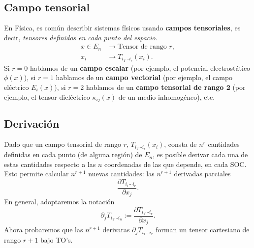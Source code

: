 \subsection{Campo tensorial}
En Física, es común describir sistemas físicos usando \textbf{campos tensoriales}, es decir, \textit{tensores definidos en cada punto del espacio}.
\begin{align}
x\in E_n & \rightarrow \text{Tensor de rango\ } r, \\
x_i & \rightarrow T_{i_1\cdots i_r}(x_i).
\end{align}
Si $r=0$ hablamos de un \textbf{campo escalar} (por ejemplo, el potencial electrostático $\phi(x)$), si $r=1$ hablamos de un \textbf{campo vectorial} (por ejemplo, el campo eléctrico $E_i(x)$), si $r=2$ hablamos de un \textbf{campo tensorial de rango 2} (por ejemplo, el tensor dieléctrico $\kappa_{ij}(x)$ de un medio inhomogéneo), etc.

\subsection{Derivación}
Dado que un campo tensorial de rango $r$,  $T_{i_1\cdots i_r}(x_i)$, consta de $n^r$ cantidades definidas en cada punto (de alguna región) de $E_n$, es posible derivar cada una de estas cantidades respecto a las $n$ coordenadas de las que depende, en cada SOC. Esto permite calcular $n^{r+1}$ nuevas cantidades: las $n^{r+1}$ derivadas parciales
\begin{equation}
\frac{\partial T_{i_1\cdots i_r}}{\partial x_j}.
\end{equation}
En general, adoptaremos la notación
\begin{equation}
\partial_jT_{i_1\cdots i_n}:= \frac{\partial T_{i_1\cdots i_r}}{\partial x_j}.
\end{equation}
Ahora probaremos que las $n^{r+1}$ derivaras $\partial_jT_{i_1\cdots i_r}$ forman un tensor cartesiano de rango $r+1$ bajo TO's.

